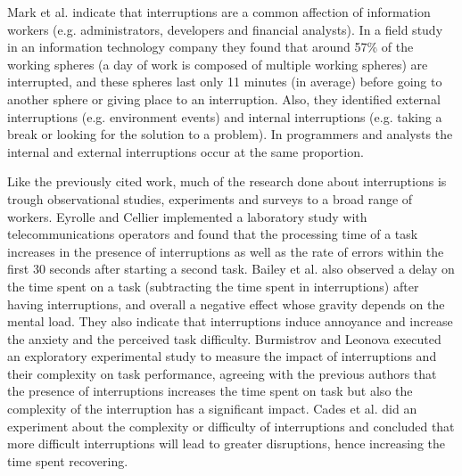 Mark et al. \cite{MGH05} indicate that interruptions are a common affection of information workers (e.g. administrators, developers and financial analysts). In a field study in an information technology company they found that around 57\% of the working spheres (a day of work is composed of multiple working spheres) are interrupted, and these spheres last only 11 minutes (in average) before going to another sphere or giving place to an interruption. Also, they identified external interruptions (e.g. environment events) and internal interruptions (e.g. taking a break or looking for the solution to a problem). In programmers and analysts the internal and external interruptions occur at the same proportion.

Like the previously cited work, much of the research done about interruptions is trough observational studies, experiments and surveys to a broad range of workers. Eyrolle and Cellier \cite{EC00} implemented a laboratory study with telecommunications operators and found that the processing time of a task increases in the presence of interruptions as well as the rate of errors within the first 30 seconds after starting a second task. Bailey et al. \cite{BKC01} also observed a delay on the time spent on a task (subtracting the time spent in interruptions) after having interruptions, and overall a negative effect whose gravity depends on the mental load. They also indicate that interruptions induce annoyance and increase the anxiety and the perceived task difficulty. Burmistrov and Leonova \cite{BL96} executed an exploratory experimental study to measure the impact of interruptions and their complexity on task performance, agreeing with the previous authors that the presence of interruptions increases the time spent on task but also the complexity of the interruption has a significant impact. Cades et al. \cite{CDT07} did an experiment about the complexity or difficulty of interruptions and concluded that more difficult interruptions will lead to greater disruptions, hence increasing the time spent recovering.

